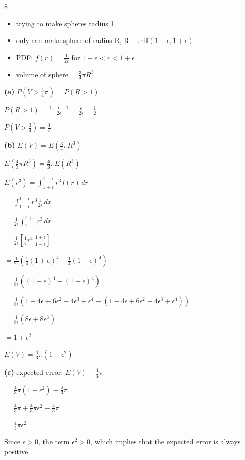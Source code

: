 \documentclass[12 pt]{article}
\begin{document}
    \begin{exercise}{8}
    \hfill

    \begin{itemize}
        \item trying to make spheres radius 1
        \item only can make sphere of radius R, R - unif$(1 - \epsilon, 1 + \epsilon)$
        \item PDF: $f(r) = \frac{1}{2 \epsilon}$ for $1 - \epsilon < r < 1 + \epsilon$
        \item volume of sphere = $\frac{3}{4} \pi R^3$
    \end{itemize}

    \textbf{(a)} $P(V > \frac{3}{4} \pi) = P(R > 1)$

    $P(R > 1) = \frac{1 + \epsilon - 1}{2 \epsilon} = \frac{\epsilon}{2 \epsilon} = \frac{1}{2}$

    $P(V > \frac{3}{4}) = \frac{1}{2}$

    \hfill

    \textbf{(b)} $E(V) = E(\frac{3}{4} \pi R^3)$

    $E(\frac{4}{3} \pi R^3) = \frac{4}{3} \pi E(R^3)$

    $E(r^3) = \int_{1 + \epsilon}^{1 - \epsilon} r^3 f(r) \, dr$

    $= \int_{1 - \epsilon}^{1 + \epsilon} r^3 \frac{1}{2 \epsilon} \, dr$

    $= \frac{1}{2 \epsilon} \int_{1 - \epsilon}^{1 + \epsilon} r^3 \, dr$

    $= \frac{1}{2 \epsilon} [\frac{1}{4} r^4 |_{1 - \epsilon}^{1 + \epsilon}]$

    $= \frac{1}{2 \epsilon} (\frac{1}{4} (1 + \epsilon)^4 - \frac{1}{4} (1 - \epsilon)^4)$

    $= \frac{1}{8 \epsilon} ((1 + \epsilon)^4 - (1 - \epsilon)^4)$

    $= \frac{1}{8 \epsilon} (1 + 4 \epsilon + 6 {\epsilon}^2 + 4{\epsilon}^3 + {\epsilon}^4 - (1 - 4 \epsilon + 6 {\epsilon}^2 - 4 {\epsilon}^3 + {\epsilon}^4))$

    $= \frac{1}{8 \epsilon}(8 \epsilon + 8 {\epsilon}^3)$

    $= 1 + {\epsilon}^2$

    $E(V) = \frac{4}{3} \pi (1 + {\epsilon}^2)$

    \hfill

    \textbf{(c)} expected error: $E(V) - \frac{4}{3} \pi$

    $= \frac{4}{3} \pi (1 + {\epsilon}^2) - \frac{4}{3} \pi$

    $= \frac{4}{3} \pi + \frac{4}{3} \pi {\epsilon}^2 - \frac{4}{3} \pi$

    $= \frac{4}{3} \pi {\epsilon}^2$

    Since $\epsilon > 0$, the term ${\epsilon}^2 > 0$, which implies that the expected error is always positive.

    \hfill
    \end{exercise}
\end{document}
